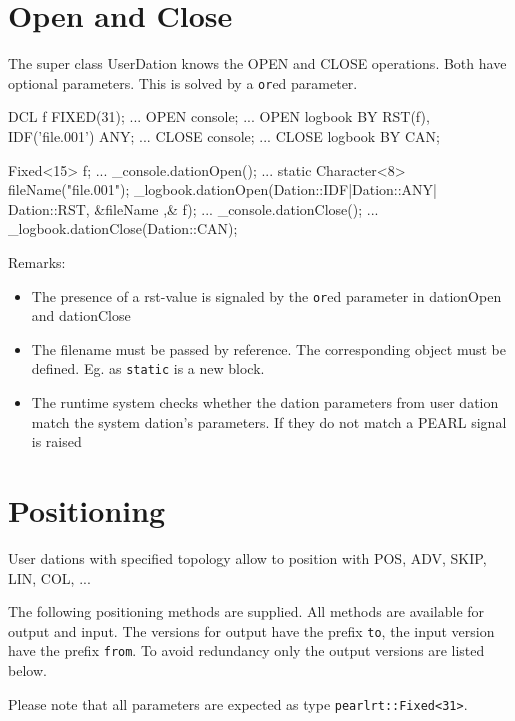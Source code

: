 \section{Open and Close}
The super class UserDation knows the OPEN and CLOSE operations.
Both have optional parameters. This is solved by a \verb|or|ed
parameter.

\begin{PEARLCode}
DCL f FIXED(31);
...
OPEN console;
...
OPEN logbook BY RST(f), IDF('file.001') ANY;
...
CLOSE console;
...
CLOSE logbook BY CAN;
\end{PEARLCode}

\begin{CppCode}
Fixed<15> f;
...
_console.dationOpen();
...
{
   static Character<8> fileName("file.001");
   _logbook.dationOpen(Dation::IDF|Dation::ANY| Dation::RST, &fileName ,& f);
}
...
_console.dationClose();
...
_logbook.dationClose(Dation::CAN);
\end{CppCode}

Remarks:
\begin{itemize}
\item The presence of a rst-value is signaled by the \verb|or|ed parameter
   in dationOpen and dationClose
\item The filename must be passed by reference. The corresponding
   object must be defined. Eg. as \verb|static| is a new block.
\item The runtime system checks whether the dation parameters from
   user dation match the system dation's parameters. 
   If they do not match a PEARL signal is raised
\end{itemize}

\section{Positioning}
User dations with specified topology allow
 to position with POS, ADV, SKIP, LIN, COL, ...

The following positioning methods are supplied.
All methods are available for output and input. The versions for 
output have the prefix \verb|to|, the input version have the prefix \verb|from|.
To avoid redundancy only the output versions are listed below.

Please note that all parameters are expected as type
\verb|pearlrt::Fixed<31>|.

